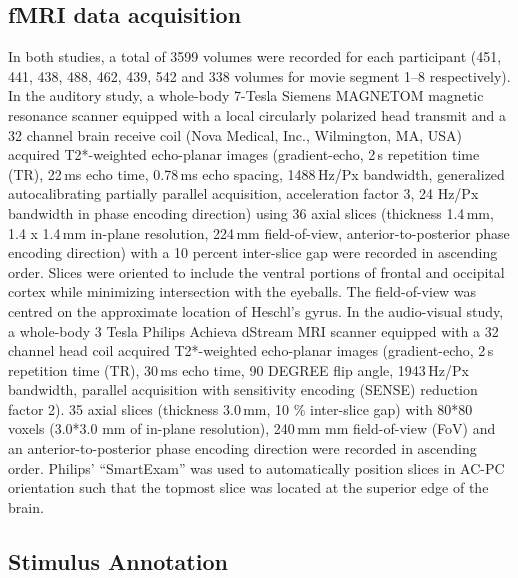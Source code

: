 \documentclass[english]{article}
\begin{document}
\subsection{fMRI data acquisition}
In both studies, a total of 3599 volumes were recorded for each participant (451, 441, 438, 488, 462, 439, 542 and 338 volumes for movie segment 1–8 respectively).
In the auditory study, a whole-body 7-Tesla Siemens MAGNETOM magnetic resonance scanner equipped with a local circularly polarized head transmit and a 32 channel brain receive coil (Nova Medical, Inc., Wilmington, MA, USA) acquired T2*-weighted echo-planar images (gradient-echo, 2\,s repetition time (TR), 22\,ms echo time, 0.78\,ms echo spacing, 1488\,Hz/Px bandwidth, generalized autocalibrating partially parallel acquisition, acceleration factor 3, 24 Hz/Px bandwidth in phase encoding direction)  using 36 axial slices (thickness 1.4\,mm, 1.4 x 1.4\,mm in-plane resolution, 224\,mm field-of-view, anterior-to-posterior phase encoding direction) with a 10 percent inter-slice gap were recorded in ascending order. Slices were oriented to include the ventral portions of frontal and occipital cortex while minimizing intersection with the eyeballs. The field-of-view was centred on the approximate location of Heschl's gyrus. 
In the audio-visual study, a whole-body 3 Tesla Philips Achieva dStream MRI scanner equipped with a 32 channel head coil acquired T2*-weighted echo-planar images (gradient-echo, 2\,s repetition time (TR), 30\,ms echo time, 90 DEGREE flip angle, 1943\,Hz/Px bandwidth, parallel acquisition with sensitivity encoding (SENSE) reduction factor 2). 35 axial slices (thickness 3.0\,mm, 10 \% inter-slice gap) with 80*80 voxels (3.0*3.0 mm of in-plane resolution), 240\,mm mm field-of-view (FoV) and an anterior-to-posterior phase encoding direction were recorded in ascending order. Philips’ “SmartExam” was used to automatically position slices in AC-PC orientation such that the topmost slice was located at the superior edge of the brain. 

\subsection{Stimulus Annotation}
\end{document}
